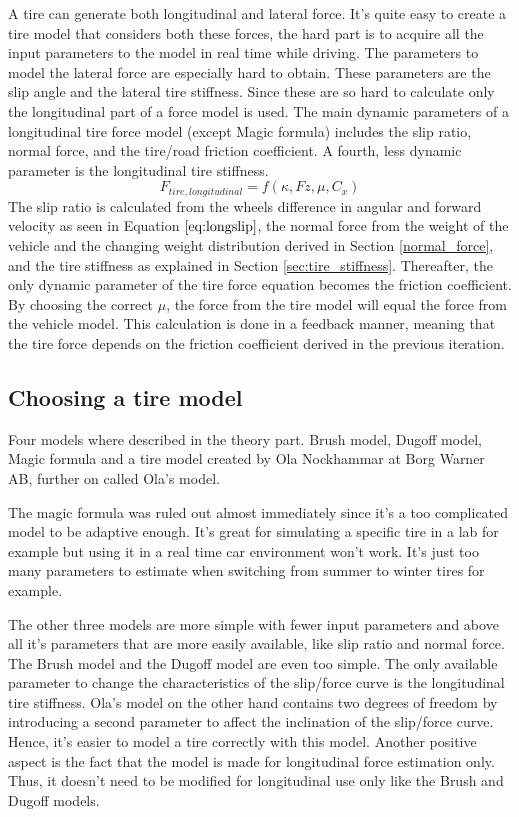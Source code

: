 A tire can generate both longitudinal and lateral force. It's quite easy to create a tire model that considers both these forces, the hard part is to acquire all the input parameters to the model in real time while driving. The parameters to model the lateral force are especially hard to obtain. These parameters are the slip angle and the lateral tire stiffness. Since these are so hard to calculate only the longitudinal part of a force model is used. The main dynamic parameters of a longitudinal tire force model (except Magic formula) includes the slip ratio, normal force, and the tire/road friction coefficient. A fourth, less dynamic parameter is the longitudinal tire stiffness. 
\begin{equation}
F_{tire, longitudinal} = f(\kappa, Fz, \mu, C_{x})
\end{equation}
The slip ratio is calculated from the wheels difference in angular and forward velocity as seen in Equation $ \ref{eq:longslip} $, the normal force from the weight of the vehicle and the changing weight distribution derived in  Section \ref{normal_force}, and the tire stiffness as explained in Section \ref{sec:tire_stiffness}. Thereafter, the only dynamic parameter of the tire force equation becomes the friction coefficient. By choosing the correct $ \mu $, the force from the tire model will equal the force from the vehicle model. This calculation is done in a feedback manner, meaning that the tire force depends on the friction coefficient derived in the previous iteration.

\subsection{Choosing a tire model}
Four models where described in the theory part. Brush model, Dugoff model, Magic formula and a tire model created by Ola Nockhammar at Borg Warner AB, further on called Ola's model.

The magic formula was ruled out almost immediately since it's a too complicated model to be adaptive enough. It's great for simulating a specific tire in a lab for example but using it in a real time car environment won't work. It's just too many parameters to estimate when switching from summer to winter tires for example.

The other three models are more simple with fewer input parameters and above all it's parameters that are more easily available, like slip ratio and normal force. The Brush model and the Dugoff model are even too simple. The only available parameter to change the characteristics of the slip/force curve is the longitudinal tire stiffness. Ola's model on the other hand contains two degrees of freedom by introducing a second parameter to affect the inclination of the slip/force curve. Hence, it's easier to model a tire correctly with this model. Another positive aspect is the fact that the model is made for longitudinal force estimation only. Thus, it doesn't need to be modified for longitudinal use only like the Brush and Dugoff models.

